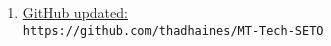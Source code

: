 \documentclass[12pt]{article}
\begin{document}
\begin{multicols}{2}
\begin{comment}
\end{comment}
	\begin{enumerate}


		

		

		\item \href{https://github.com/thadhaines/MT-Tech-SETO}{GitHub updated:}\\
	{\footnotesize \verb|https://github.com/thadhaines/MT-Tech-SETO| }\\
	\end{enumerate}


\end{multicols}
\end{document}
